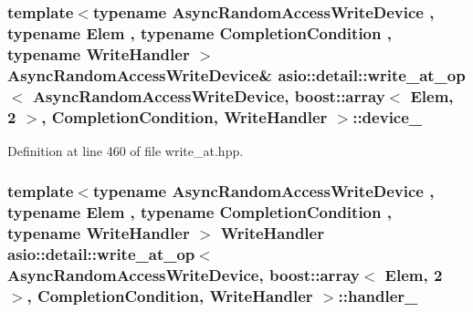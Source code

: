 \subsubsection[{device\+\_\+}]{\setlength{\rightskip}{0pt plus 5cm}template$<$typename Async\+Random\+Access\+Write\+Device , typename Elem , typename Completion\+Condition , typename Write\+Handler $>$ Async\+Random\+Access\+Write\+Device\& {\bf asio\+::detail\+::write\+\_\+at\+\_\+op}$<$ Async\+Random\+Access\+Write\+Device, {\bf boost\+::array}$<$ Elem, 2 $>$,                           Completion\+Condition, Write\+Handler $>$\+::device\+\_\+}\label{classasio_1_1detail_1_1write__at__op_3_01_async_random_access_write_device_00_01boost_1_1array_3e439bc739a816bec12c3cd7d54fe10a0_a9aa9bce544ac9239832813138f955995}


Definition at line 460 of file write\+\_\+at.\+hpp.

\hypertarget{classasio_1_1detail_1_1write__at__op_3_01_async_random_access_write_device_00_01boost_1_1array_3e439bc739a816bec12c3cd7d54fe10a0_aeacdd65faab97db1ad970f9ddce7582b}{}
\subsubsection[{handler\+\_\+}]{\setlength{\rightskip}{0pt plus 5cm}template$<$typename Async\+Random\+Access\+Write\+Device , typename Elem , typename Completion\+Condition , typename Write\+Handler $>$ Write\+Handler {\bf asio\+::detail\+::write\+\_\+at\+\_\+op}$<$ Async\+Random\+Access\+Write\+Device, {\bf boost\+::array}$<$ Elem, 2 $>$,                           Completion\+Condition, Write\+Handler $>$\+::handler\+\_\+}\label{classasio_1_1detail_1_1write__at__op_3_01_async_random_access_write_device_00_01boost_1_1array_3e439bc739a816bec12c3cd7d54fe10a0_aeacdd65faab97db1ad970f9ddce7582b}


